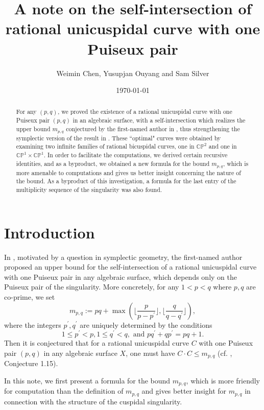 \documentclass[11pt]{amsart}
\theoremstyle{plain}
\numberwithin{theorem}{section}
\theoremstyle{definition}
\newcommand{\C}{{\mathbb C}}
\renewcommand{\P}{{\mathbb P}}
\begin{document}
\title[Self-intersection of rational unicuspidal curves]
{A note on the self-intersection of rational unicuspidal curve with one Puiseux pair}
\author{Weimin Chen, Yusupjan Ouyang and Sam Silver}
\subjclass[2000]{}
\keywords{}
\date{\today}
\maketitle
\begin{abstract}
For any $(p,q)$, we proved the existence of a rational unicuspidal curve with one Puiseux pair $(p,q)$ in an algebraic surface, with a self-intersection which realizes the upper bound $m_{p,q}$ conjectured by the first-named author in \cite{C}, thus strengthening the symplectic version of the result in \cite{C}.
These  ``optimal" curves were obtained by examining two infinite families of rational bicuspidal curves, one in $\C\P^2$ and one in $\C\P^1\times \C\P^1$. In order to facilitate the computations, we derived certain recursive identities, and as a byproduct, we obtained a new formula for the bound $m_{p,q}$, which is more amenable to computations and gives us better insight concerning the nature of the bound. As a byproduct of this investigation, a formula for the last entry of the multiplicity sequence of the singularity was also found. 
\end{abstract}

\section{Introduction}

In \cite{C}, motivated by a question in symplectic geometry, the first-named author proposed an upper bound for the self-intersection of a rational unicuspidal curve with one Puiseux pair in any algebraic surface, which depends only on the Puiseux pair of the singularity. More concretely, for any 
$1<p<q$ where $p,q$ are co-prime, we set 
$$
m_{p,q}:=pq +\max (\lfloor \frac{p}{p-p^\prime}\rfloor, \lfloor \frac{q}{q-q^\prime}\rfloor), 
$$
where the integers $p^\prime,q^\prime$ are uniquely determined by the conditions 
$$
1\leq p^\prime<p, 1\leq q^\prime<q, \mbox{ and } pq^\prime+qp^\prime=pq+1.
$$
Then it is conjectured that for a rational unicuspidal curve $C$ with one Puiseux pair $(p,q)$ in any algebraic surface $X$, one must have $C\cdot C\leq m_{p,q}$ (cf. \cite{C}, Conjecture 1.15). 

In this note, we first present a formula for the bound $m_{p,q}$, which is more friendly for computation than the definition of $m_{p,q}$ and gives better insight for $m_{p,q}$ in connection with the structure of the cuspidal singularity. 
\end{document}
